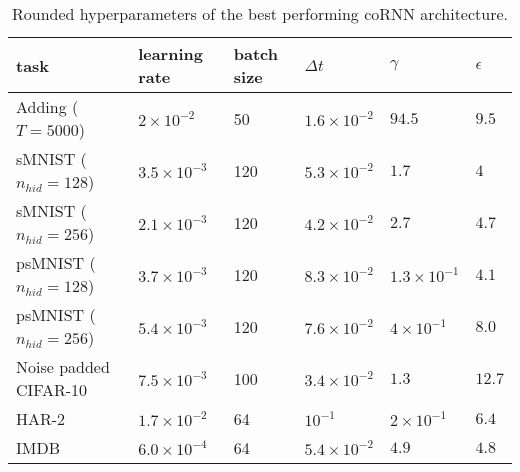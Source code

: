 \documentclass{article} \usepackage{iclr2021_conference,times}
\begin{document}
\begin{table}[h!]
  \caption{Rounded hyperparameters of the best performing coRNN architecture.}
  \label{tab:hyperparameters_rounded}
  \centering
  \begin{tabular}{llllll}
    \toprule
    \cmidrule(r){1-6}
    task & learning rate & batch size  & $\Delta t$ & 
    $\gamma$ & $\epsilon$ \\
    \midrule
Adding ($T=5000$) & $2\times 10^{-2}$ &50& $1.6\times10^{-2}$ & $94.5$ & $9.5$\\
sMNIST ($n_{hid}=128$) & $3.5\times10^{-3}$ & 120 & $5.3\times10^{-2}$ & $1.7$  & $4$\\
sMNIST ($n_{hid}=256$) & $2.1\times10^{-3}$&  120& $4.2\times10^{-2}$ & $2.7$& $4.7$\\
psMNIST ($n_{hid}=128$) &$3.7\times10^{-3}$ & 120 & $8.3\times10^{-2}$ & $1.3\times10^{-1}$ & $4.1$ \\
psMNIST ($n_{hid}=256$) & $5.4\times10^{-3}$& 120 & $7.6\times10^{-2}$ &$4\times10^{-1}$  & $8.0$ \\
Noise padded CIFAR-10 & $7.5\times 10^{-3}$ &100& $3.4\times10^{-2}$ & $1.3$ & $12.7$\\
HAR-2 & $1.7\times 10^{-2}$ &64& $10^{-1}$ & $2\times 10^{-1}$ & $6.4$\\
IMDB & $6.0\times 10^{-4}$ & 64 & $5.4\times 10^{-2}$& $4.9$ & $4.8$\\
    \bottomrule
  \end{tabular}
\end{table}
\end{document}
